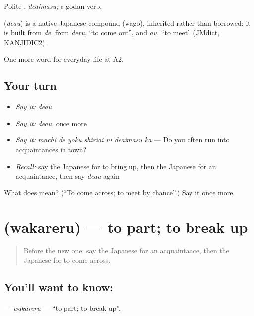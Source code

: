 Polite \textbf{}, \emph{deaimasu}; a godan verb.

\begin{cousinweb}
\textbf{} (\emph{deau}) is a native Japanese compound (wago), inherited rather than borrowed: it is built from \emph{de}, from \emph{deru}, \textquotedblleft{}to come out\textquotedblright{}, and \emph{au}, \textquotedblleft{}to meet\textquotedblright{} (JMdict, KANJIDIC2).
\end{cousinweb}

\begin{grammarlens}[title={What you've built}]
One more word for everyday life at A2.
\end{grammarlens}

\subsection*{Your turn}
\begin{itemize}
\raggedright
  \item \emph{Say it:} \emph{deau}
  \item \emph{Say it:} \emph{deau}, once more
  \item \emph{Say it:} \emph{machi de yoku shiriai ni deaimasu ka} — Do you often run into acquaintances in town?
  \item \emph{Recall:} say the Japanese for to bring up, then the Japanese for an acquaintance, then say \emph{deau} again
\end{itemize}

\begin{tcolorbox}[breakable,colback=teal!4,colframe=teal!35!black,title={Before you move on}]
What does  mean? (\textquotedblleft{}To come across; to meet by chance\textquotedblright{}.) Say it once more.
\end{tcolorbox}
\section[\texorpdfstring{\ja{わかれる} (wakareru)}{わかれる (wakareru)}]{ (wakareru) — to part; to break up}

\label{lesson:JA-C244-wakareru}



\begin{quote}
Before the new one: say the Japanese for an acquaintance, then the Japanese for to come across.
\end{quote}

\subsection*{You'll want to know: }
\textbf{} — \emph{wakareru} — \textquotedblleft{}to part; to break up\textquotedblright{}.


